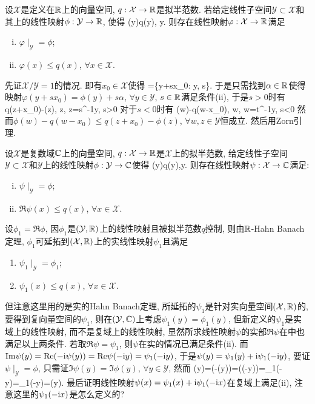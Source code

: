 设$\mathcal X$是定义在$\mathbb{R}$上的向量空间, $q: \mathcal{X}\to \mathbb{R}$是拟半范数. 
若给定线性子空间$\mathcal{Y}\subset\mathcal{X}$和其上的线性映射$\phi: \mathcal{Y}\to\mathbb{R}$, 使得
\bee
\phi(y)\le q(y), \forall y\in{}.
\eee
则存在线性映射$\varphi: \mathcal{X}\to\mathbb{R}$满足
\begin{enumerate}[(i)]
 \item $\varphi\mid_{\mathcal{Y}}=\phi$;
 \item $\varphi(x)\le q(x)$, $\forall x\in\mathcal{X}$.
\end{enumerate}
\et
\ba
先证$\mathcal{X}/\mathcal{Y}=1$的情况. 即有$x_0\in \mathcal{X}$使得
\bee
{}=\{y+sx_0: y\in{}, s\in{}\}.
\eee
于是只需找到$\alpha\in\mathbb{R}$使得映射$\varphi(y+sx_0)=\phi(y)+s\alpha$, $\forall y\in\mathcal{Y}$, 
$s\in\mathbb{R}$满足条件(ii), 于是$s>0$时有
\bee
\alpha\le q(z+x_0)-\phi(z), \forall z\in{}, z=s^{-1}y, s>0
\eee
对于$s<0$时有
\bee
\alpha\ge\phi(w)-q(w-x_0), \forall w\in{}, w=t^{-1}y, s<0
\eee
然而$\phi(w)-q(w-x_0)\le q(z+x_0)-\phi(z)$, $\forall w,z\in\mathcal{Y}$恒成立.
然后用Zorn引理.
\ea

设$\mathcal{X}$是复数域$\mathbb{C}$上的向量空间, $q: \mathcal{X}\to\mathbb{R}$是$\mathcal{X}$上的拟半范数, 
给定线性子空间$\mathcal{Y}\subset\mathcal{X}$和$\mathcal{Y}$上的线性映射$\phi: \mathcal{Y}\to\mathbb{C}$使得
\bee
\Re\phi(y)\le q(y),\quad\forall y\in{}.
\eee
则存在线性映射$\psi:\mathcal{X}\to\mathbb{C}$满足:
\begin{enumerate}[(i)]
 \item $\psi\mid_{\mathcal{Y}}=\phi$;
 \item $\Re\psi(x)\le q(x)$, $\forall x\in\mathcal{X}$.
\end{enumerate}
\eu
\ba
设$\phi_1=\Re\phi$, 因$\phi_1$是$(\mathcal{Y},\mathbb{R})$上的线性映射且被拟半范数$q$控制, 
则由$\mathbb{R}$-Hahn Banach定理, $\phi_1$可延拓到$(\mathcal{X},\mathbb{R})$上的实线性映射$\psi_1$且满足
\begin{enumerate}[(i')]
 \item $\psi_1\mid_{\mathcal{Y}}=\phi_1$;
 \item $\psi_1(x)\le q(x)$, $\forall x\in\mathcal{X}$.
\end{enumerate}
但注意这里用的是实的Hahn Banach定理, 所延拓的$\psi_1$是针对实向量空间$(\mathcal{X},\mathbb{R})$的, 要得到复向量空间的$\psi_1$, 
则在$(\mathcal{Y},\mathbb{C})$上考虑$\psi_1(y)=\phi_1(y)$, 但新定义的$\psi_1$是实域上的线性映射, 而不是复域上的线性映射, 
显然所求线性映射$\psi$的实部$\Re\psi$在{\color{red}{实线性空间}}中也满足以上两条件. 
若取$\Re \psi=\psi_1$, 则$\psi$在实的情况已满足条件(ii). 而$\mathrm{Im}\psi(y)=\mathrm{Re}(-\mathrm{i}\psi(y))=\mathrm{Re}\psi(-\mathrm{i} y)=\psi_1(-\mathrm{i} y)$, 于是$\psi(y)=\psi_1(y)+\mathrm{i}\psi_1(-\mathrm{i} y)$, 
要证$\psi\mid_{\mathcal{Y}}=\phi$, 只需证$\Im\psi(y)=\Im\phi(y)$, $\forall y\in\mathcal{Y}$, 然而
\bee
\Im\phi(y)=\Re(-\ui\phi(y))=\Re(\phi(-\ui y))=\phi_1(-\ui y)=\psi_1(-\ui y)=\Im\psi(y).
\eee
最后证明线性映射$\psi(x)=\psi_1(x)+\mathrm{i}\psi_1(-\mathrm{i} x)$在复域上满足(ii), 注意这里的$\psi_1(-\mathrm{i} x)$是怎么定义的?
\ea

